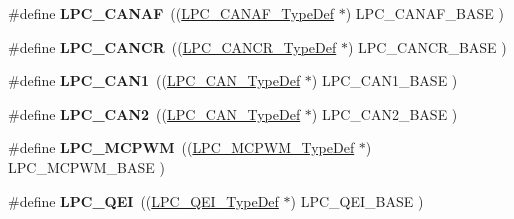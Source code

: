 \begin{DoxyCompactItemize}
\item 
\hypertarget{group___l_p_c17xx___system_ga4f738c971938302f38d54e662c9f7774}{\#define {\bfseries \-L\-P\-C\-\_\-\-C\-A\-N\-A\-F}~((\hyperlink{struct_l_p_c___c_a_n_a_f___type_def}{\-L\-P\-C\-\_\-\-C\-A\-N\-A\-F\-\_\-\-Type\-Def}     $\ast$) \-L\-P\-C\-\_\-\-C\-A\-N\-A\-F\-\_\-\-B\-A\-S\-E    )}\label{group___l_p_c17xx___system_ga4f738c971938302f38d54e662c9f7774}

\item 
\hypertarget{group___l_p_c17xx___system_gadc209557a5736e29149b96018056fc29}{\#define {\bfseries \-L\-P\-C\-\_\-\-C\-A\-N\-C\-R}~((\hyperlink{struct_l_p_c___c_a_n_c_r___type_def}{\-L\-P\-C\-\_\-\-C\-A\-N\-C\-R\-\_\-\-Type\-Def}     $\ast$) \-L\-P\-C\-\_\-\-C\-A\-N\-C\-R\-\_\-\-B\-A\-S\-E    )}\label{group___l_p_c17xx___system_gadc209557a5736e29149b96018056fc29}

\item 
\hypertarget{group___l_p_c17xx___system_ga2f006d6888921f8336dce504eb56f4aa}{\#define {\bfseries \-L\-P\-C\-\_\-\-C\-A\-N1}~((\hyperlink{struct_l_p_c___c_a_n___type_def}{\-L\-P\-C\-\_\-\-C\-A\-N\-\_\-\-Type\-Def}       $\ast$) \-L\-P\-C\-\_\-\-C\-A\-N1\-\_\-\-B\-A\-S\-E     )}\label{group___l_p_c17xx___system_ga2f006d6888921f8336dce504eb56f4aa}

\item 
\hypertarget{group___l_p_c17xx___system_ga838776140ad5e0156715278f8bb0652d}{\#define {\bfseries \-L\-P\-C\-\_\-\-C\-A\-N2}~((\hyperlink{struct_l_p_c___c_a_n___type_def}{\-L\-P\-C\-\_\-\-C\-A\-N\-\_\-\-Type\-Def}       $\ast$) \-L\-P\-C\-\_\-\-C\-A\-N2\-\_\-\-B\-A\-S\-E     )}\label{group___l_p_c17xx___system_ga838776140ad5e0156715278f8bb0652d}

\item 
\hypertarget{group___l_p_c17xx___system_ga6fe8e415821195a786b3f0dc5e7fc9fa}{\#define {\bfseries \-L\-P\-C\-\_\-\-M\-C\-P\-W\-M}~((\hyperlink{struct_l_p_c___m_c_p_w_m___type_def}{\-L\-P\-C\-\_\-\-M\-C\-P\-W\-M\-\_\-\-Type\-Def}     $\ast$) \-L\-P\-C\-\_\-\-M\-C\-P\-W\-M\-\_\-\-B\-A\-S\-E    )}\label{group___l_p_c17xx___system_ga6fe8e415821195a786b3f0dc5e7fc9fa}

\item 
\hypertarget{group___l_p_c17xx___system_ga71347b58898f54f8e9f00a6c652c7d49}{\#define {\bfseries \-L\-P\-C\-\_\-\-Q\-E\-I}~((\hyperlink{struct_l_p_c___q_e_i___type_def}{\-L\-P\-C\-\_\-\-Q\-E\-I\-\_\-\-Type\-Def}       $\ast$) \-L\-P\-C\-\_\-\-Q\-E\-I\-\_\-\-B\-A\-S\-E      )}\label{group___l_p_c17xx___system_ga71347b58898f54f8e9f00a6c652c7d49}


\end{DoxyCompactItemize}
